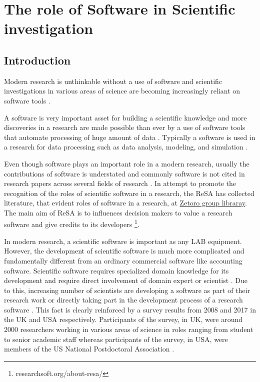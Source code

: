\chapter{The role of Software in Scientific investigation}
\label{ch:Roles}

%

\section{Introduction}
\label{sec:background:intro}

Modern research is unthinkable without a use of software and scientific investigations in various areas of science are becoming increasingly reliant on software tools \citep{goble2014better, wilson2014best, storer2017bridging}.

A software is very important asset for building a scientific knowledge and more discoveries in a research are made possible than ever by a use of software tools that automate processing of huge amount of data \citep{jimenez2017four}. Typically a software is used in a research for data processing such as data analysis, modeling, and simulation \cite{hannay2009scientists, pan2016disciplinary}.

Even though software plays an important role in a modern research, usually the contributions of software is understated and commonly software is not cited in research papers across several fields of research \cite{yang2018important,pan2016disciplinary}.  In attempt to promote the recognition of the roles of scientific software in a research, the \ac{ReSA} has collected literature, that evident roles of software in a research, at \href{https://www.zotero.org/groups/2400609/resa/library}{Zetoro group libraray}. The main aim of \ac{ReSA} is to influences decision makers to value a research software and give credits to its developers \footnote{researchsoft.org/about-resa/}. 

In modern research, a scientific software is important as any LAB equipment. However, the development of scientific software is much more complicated and fundamentally different from an ordinary commercial software like accounting software. Scientific software requires specialized domain knowledge for its development and require direct involvement of domain expert or scientist  \citep{wilson2014best,segal2008developing}. Due to this, increasing number of scientists are developing a software as part of their research work or directly taking part in the development process of a research software \citep{jimenez2017four, kanewala2014testing}. This fact is clearly reinforced by a  survey results  from 2008 and 2017  in the \ac{UK} and \ac{USA} respectively. Participants of the survey, in UK, were around 2000 researchers working in various areas of science in roles ranging from student to senior academic staff whereas participants of the survey, in \ac{USA}, were members of the US National Postdoctoral Association \citep{merali2010computational, hettrick2014uk, nangia2017track}.  


